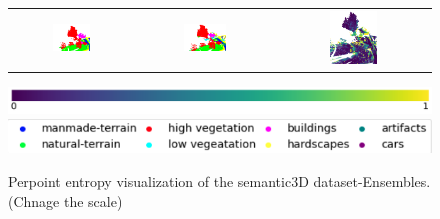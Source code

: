 \begin{figure}[h!]
\begin{tabular}{ccc}
            \includegraphics[width=0.33\textwidth, height=0.18\textheight]{images/seg_output/sem3d_seg_output/3_GT.png} &
            \includegraphics[width=0.33\textwidth, height=0.18\textheight]{images/seg_output/sem3d_seg_output/3_Pred.png}& 
            \includegraphics[width=0.33\textwidth, height=0.18\textheight]{images/seg_output/sem3d_seg_output/ent_de_3.png}\\
        \end{tabular}
        \includegraphics[scale=0.45]{images/prob_legend.pdf}
        \includegraphics[scale=0.65]{images/legend.png}
        \caption{Perpoint entropy visualization of the semantic3D dataset-Ensembles. (Chnage the scale)}
        \label{fig:de_sem3d_entmap}
    \end{figure}

